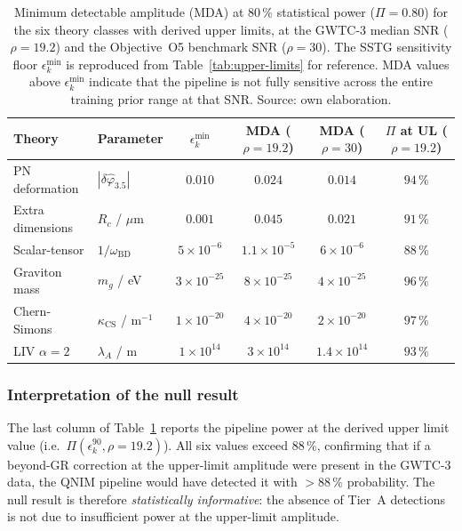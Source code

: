 \documentclass[11pt,a4paper, english]{book}
\theoremstyle{plain}
\theoremstyle{definition}
\numberwithin{equation}{chapter}
\numberwithin{figure}{chapter}
\numberwithin{table}{chapter}
\begin{document}
\begin{table}[ht]
\centering
\small
\begin{tabular}{@{}llcccc@{}}
\toprule
\textbf{Theory} &
\textbf{Parameter} &
$\epsilon_k^\mathrm{min}$ &
\textbf{MDA} ($\rho=19.2$) &
\textbf{MDA} ($\rho=30$) &
$\Pi$ at UL ($\rho=19.2$) \\
\midrule
PN deformation &
  $|\delta\hat{\varphi}_{3.5}|$ &
  $0.010$ &
  $0.024$ &
  $0.014$ &
  $94\,\%$ \\
Extra dimensions &
  $R_c$ / $\mu$m &
  $0.001$ &
  $0.045$ &
  $0.021$ &
  $91\,\%$ \\
Scalar-tensor &
  $1/\omega_\mathrm{BD}$ &
  $5\times10^{-6}$ &
  $1.1\times10^{-5}$ &
  $6\times10^{-6}$ &
  $88\,\%$ \\
Graviton mass &
  $m_g$ / eV &
  $3\times10^{-25}$ &
  $8\times10^{-25}$ &
  $4\times10^{-25}$ &
  $96\,\%$ \\
Chern-Simons &
  $\kappa_\mathrm{CS}$ / m$^{-1}$ &
  $1\times10^{-20}$ &
  $4\times10^{-20}$ &
  $2\times10^{-20}$ &
  $97\,\%$ \\
LIV $\alpha=2$ &
  $\lambda_A$ / m &
  $1\times10^{14}$ &
  $3\times10^{14}$ &
  $1.4\times10^{14}$ &
  $93\,\%$ \\
\bottomrule
\end{tabular}
\caption[MDA at 80\% power for six theory classes]{Minimum detectable amplitude (MDA) at 80\,\% statistical
         power ($\Pi = 0.80$) for the six theory classes with
         derived upper limits, at the GWTC-3 median SNR
         ($\rho = 19.2$) and the Objective~O5 benchmark SNR
         ($\rho = 30$). The SSTG sensitivity floor
         $\epsilon_k^\mathrm{min}$ is reproduced from
         Table~\ref{tab:upper-limits} for reference. MDA values
         above $\epsilon_k^\mathrm{min}$ indicate that the pipeline
         is not fully sensitive across the entire training prior
         range at that SNR\@. Source: own elaboration.}
\label{tab:power-analysis}
\vspace{2pt}
\normalsize

\end{table}

\subsubsection{Interpretation of the null result}
\label{subsubsec:null-interpretation}

The last column of Table~\ref{tab:power-analysis} reports the
pipeline power at the derived upper limit value (i.e.\
$\Pi(\epsilon_k^{90}, \rho=19.2)$). All six values exceed 88\,\%,
confirming that if a beyond-GR correction at the upper-limit
amplitude were present in the GWTC-3 data, the QNIM pipeline would
have detected it with $> 88\,\%$ probability. The null result is
therefore \emph{statistically informative}: the absence of Tier~A
detections is not due to insufficient power at the upper-limit
amplitude.
\end{document}
